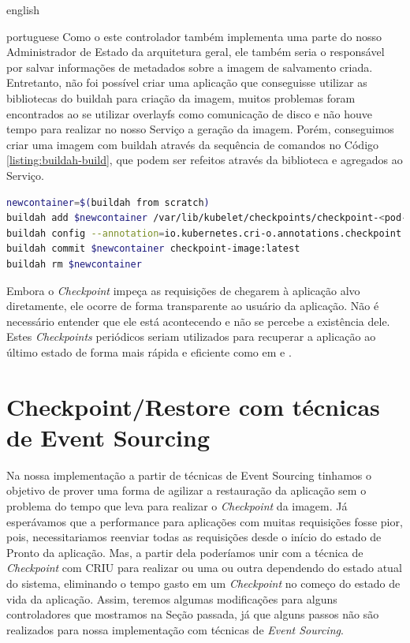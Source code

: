 \begin{otherlanguage*}{english}
\begin{otherlanguage*}{portuguese}
Como o este controlador também implementa uma parte do nosso Administrador de Estado da 
arquitetura geral, ele também seria o responsável por salvar informações de metadados
sobre a imagem de salvamento criada. Entretanto, não foi possível criar uma aplicação
que conseguisse utilizar as bibliotecas do buildah para criação da imagem, muitos
problemas foram encontrados ao se utilizar overlayfs como comunicação de disco e não
houve tempo para realizar no nosso Serviço a geração da imagem. Porém, conseguimos criar
uma imagem com buildah através da sequência de comandos no Código
\ref{listing:buildah-build}, que podem ser refeitos através da biblioteca e agregados ao
Serviço.

\begin{lstlisting}[language=bash,caption={Comandos do buildah para construir a imagem de recuperação a partir de um Checkpoint feito pelo CRIU através do kubelet.},label={listing:buildah-build}]
newcontainer=$(buildah from scratch)
buildah add $newcontainer /var/lib/kubelet/checkpoints/checkpoint-<pod-name>_<namespace-name>-<container-name>-<timestamp>.tar /
buildah config --annotation=io.kubernetes.cri-o.annotations.checkpoint.name=<container-name> $newcontainer
buildah commit $newcontainer checkpoint-image:latest
buildah rm $newcontainer
\end{lstlisting}

Embora o \textit{Checkpoint} impeça as requisições de chegarem à aplicação alvo
diretamente, ele ocorre de forma transparente ao usuário da aplicação. Não é
necessário entender que ele está acontecendo e não se percebe a existência dele. 
Estes \textit{Checkpoints} periódicos seriam utilizados para recuperar a aplicação
ao último estado de forma mais rápida e eficiente como em \cite{vayghan2021kubernetes}
\cite{muller2022architecture} \cite{oh2018stateful} e \cite{schmidttransparent}.

\section{Checkpoint/Restore com técnicas de Event Sourcing}

Na nossa implementação a partir de técnicas de Event Sourcing tinhamos o objetivo de
prover uma forma de agilizar a restauração da aplicação sem o problema do tempo que leva
para realizar o \textit{Checkpoint} da imagem. Já esperávamos que a performance para
aplicações com muitas requisições fosse pior, pois, necessitariamos reenviar todas as
requisições desde o início do estado de Pronto da aplicação. Mas, a partir dela
poderíamos unir com a técnica de \textit{Checkpoint} com CRIU para realizar ou uma ou
outra dependendo do estado atual do sistema, eliminando o tempo gasto em um
\textit{Checkpoint} no começo do estado de vida da aplicação. Assim, teremos algumas
modificações para alguns controladores que mostramos na Seção passada, já que alguns
passos não são realizados para nossa implementação com técnicas de \textit{Event Sourcing}.


\end{otherlanguage*}
\end{otherlanguage*}
